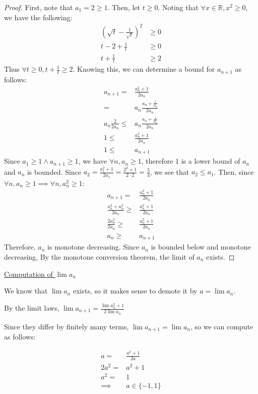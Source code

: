 \documentclass{article}
\newcommand{\reals}{\ensuremath{\mathbb{R}}}
\begin{document}
\begin{proof}
	First, note that $a_1 = 2 \geq 1$.
	Then, let $t \geq 0$. Noting that $\forall x \in \reals, x^2 \geq 0$, we have the following:
	\begin{align}
		(\sqrt{t} - \frac{1}{\sqrt{t}})^2 & \geq 0 \\
		t - 2 + \frac{1}{t} & \geq 0 \\
		t + \frac{1}{t} & \geq 2
	\end{align}
	Thus $\forall t \geq 0, t + \frac{1}{t} \geq 2$.
	Knowing this, we can determine a bound for $a_{n+1}$ as follows:
	\begin{align}
		a_{n+1} = & \frac{a_n^2 + 1}{2a_n} \\
		= & a_n \frac{a_n + \frac{1}{a_n}}{2a_n} \\
		a_n\frac{2}{2a_n} \le & a_n \frac{a_n + \frac{1}{a_n}}{2a_n} \\
		1 \le & \frac{a_n^2 + 1}{2a_n} \\
		1 \le & a_{n+1}
	\end{align}
	Since $a_1 \geq 1 \land a_{n+1} \geq 1$,
	we have $\forall n, a_n \geq 1$,
	therefore $1$ is a lower bound of $a_n$
	and $a_n$ is bounded.
	Since $a_2 = \frac{a_1^2 + 1}{2a_1} = \frac{2^2 + 1}{2 \cdot 2} = \frac{5}{4}$,
	we see that $a_2 \le a_1$.
	Then, since $\forall n, a_n \geq 1 \implies \forall n, a_n^2 \geq 1$:
	\begin{align}
		a_{n+1} = & \frac{a_n^2 + 1}{2a_n} \\
		\frac{a_n^2 + a_n^2}{2a_n} \geq & \frac{a_n^2+1}{2a_n} \\
		\frac{2a_n^2}{2a_n} \geq & \frac{a_n^2+1}{2a_n} \\
		a_n \geq & a_{n+1}
	\end{align}
	Therefore, $a_n$ is monotone decreasing.
	Since $a_n$ is bounded below and monotone decreasing,
	By the monotone conversion theorem,
	the limit of $a_n$ exists.
\end{proof}

\underline{Computation of $\lim a_n$}

We know that $\lim a_n$ exists, so it makes sense to demote it by $a = \lim a_n$.

By the limit laws, $\lim a_{n+1} = \frac{\lim a_n^2 + 1}{2\lim{a_n}}$

Since they differ by finitely many terms, $\lim a_{n+1} = \lim a_n$,
so we can compute as follows:

\begin{align}
	a = & \frac{a^2 + 1}{2a} \\
	2a^2 = & a^2 + 1 \\
	a^2 = & 1 \\
	\implies & a \in \{ -1, 1\}
\end{align}
\end{document}
